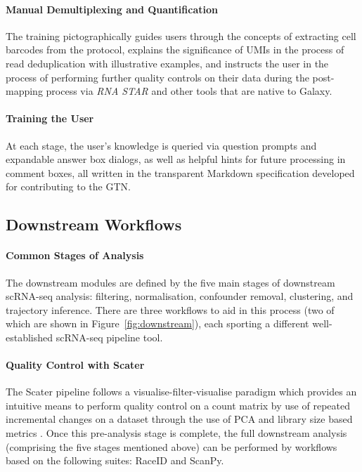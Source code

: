 \documentclass[a4paper,num-refs]{oup-contemporary}
\newcommand{\prog}[1]{\textit{#1}} %
\begin{document}
\paragraph{Manual Demultiplexing and Quantification}
The training pictographically guides users through the concepts of extracting cell barcodes from the protocol, explains the significance of UMIs in the process of read deduplication with illustrative examples, and instructs the user in the process of performing further quality controls on their data during the post-mapping process via \prog{RNA STAR} and other tools that are native to Galaxy. 

\paragraph{Training the User}
At each stage, the user's knowledge is queried via question prompts and expandable answer box dialogs, as well as helpful hints for future processing in comment boxes, all written in the transparent Markdown specification developed for contributing to the GTN.

\subsection{Downstream Workflows}

\paragraph{Common Stages of Analysis}
The downstream modules are defined by the five main stages of downstream scRNA-seq analysis: filtering, normalisation, confounder removal, clustering, and trajectory inference. There are three workflows to aid in this process (two of which are shown in Figure~\ref{fig:downstream}), each sporting a different well-established scRNA-seq pipeline tool.

\paragraph{Quality Control with Scater}
The Scater pipeline follows a visualise-filter-visualise paradigm which provides an intuitive means to perform quality control on a count matrix by use of repeated incremental changes on a dataset through the use of PCA and library size based metrics \citep{etherington2019galaxy}. Once this pre-analysis stage is complete, the full downstream analysis (comprising the five stages mentioned above) can be performed by workflows based on the following suites: RaceID and ScanPy.
\end{document}

